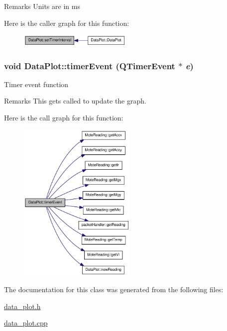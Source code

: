 \begin{DoxyRemark}{Remarks}
Units are in ms 
\end{DoxyRemark}




Here is the caller graph for this function:\nopagebreak
\begin{figure}[H]
\begin{center}
\leavevmode
\includegraphics[width=154pt]{classDataPlot_a926020e0c49d78d3d5d282848368651e_icgraph}
\end{center}
\end{figure}


\hypertarget{classDataPlot_a41c9c4bc12d8d3e3abdf893c4fcfad7b}{
\subsubsection[{timerEvent}]{\setlength{\rightskip}{0pt plus 5cm}void DataPlot::timerEvent (QTimerEvent $\ast$ {\em e})}}
\label{classDataPlot_a41c9c4bc12d8d3e3abdf893c4fcfad7b}
Timer event function

\begin{DoxyRemark}{Remarks}
This gets called to update the graph. 
\end{DoxyRemark}


Here is the call graph for this function:\nopagebreak
\begin{figure}[H]
\begin{center}
\leavevmode
\includegraphics[width=160pt]{classDataPlot_a41c9c4bc12d8d3e3abdf893c4fcfad7b_cgraph}
\end{center}
\end{figure}




The documentation for this class was generated from the following files:\begin{DoxyCompactItemize}
\item 
\hyperlink{data__plot_8h}{data\_\-plot.h}\item 
\hyperlink{data__plot_8cpp}{data\_\-plot.cpp}\end{DoxyCompactItemize}
